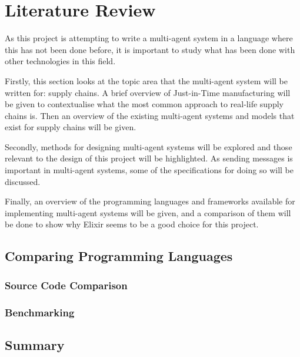 \section{Literature Review}

As this project is attempting to write a multi-agent system in a language where this has not been done before, it is important to study what has been done with other technologies in this field.

Firstly, this section looks at the topic area that the multi-agent system will be written for: supply chains.
A brief overview of Just-in-Time manufacturing will be given to contextualise what the most common approach to real-life supply chains is.
Then an overview of the existing multi-agent systems and models that exist for supply chains will be given.

Secondly, methods for designing multi-agent systems will be explored and those relevant to the design of this project will be highlighted.
As sending messages is important in multi-agent systems, some of the specifications for doing so will be discussed.

Finally, an overview of the programming languages and frameworks available for implementing multi-agent systems will be given, and a comparison of them will be done to show why Elixir seems to be a good choice for this project.







\subsection{Comparing Programming Languages}

\subsubsection{Source Code Comparison}

\subsubsection{Benchmarking}

\subsection{Summary}

